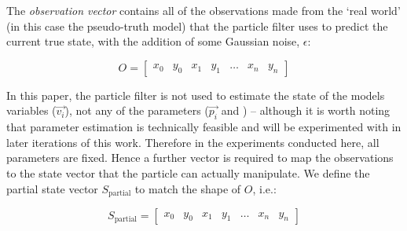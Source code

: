 The \textit{observation vector} contains all of the observations made from the `real world' (in this case the pseudo-truth model) that the particle filter uses to predict the current true state, with the addition of some Gaussian noise, $\epsilon$:

\begin{equation}
  O  = \left[ \begin{array}{ccccccc}
x_0 & y_0 & x_1 & y_1 & \dots & x_n & y_n 
\end{array} \right]
\end{equation} 

In this paper, the particle filter is not used to estimate the state of the models variables ($\overrightarrow{v_i}$), not any of the parameters ($\overrightarrow{p_i}$ and ) -- although it is worth noting that parameter estimation is technically feasible and will be experimented with in later iterations of this work. Therefore in the experiments conducted here, all parameters are fixed. Hence a further vector is required to map the observations to the state vector that the particle can actually manipulate. We define the partial state vector $S_\textrm{partial}$ to match the shape of $O$, i.e.:

\begin{equation}
  S_\textrm{partial}  = \left[ \begin{array}{ccccccc}
x_0 & y_0 & x_1 & y_1 & \dots & x_n & y_n 
\end{array} \right]
\end{equation} 

